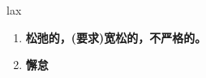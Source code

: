 
\begin{frame}
{\huge lax}
\begin{center}
\begin{enumerate}\Large
  \item \textbf{松弛的，(要求)宽松的，不严格的。}
  \item \textbf{懈怠}
\end{enumerate}
\end{center}
\end{frame}

